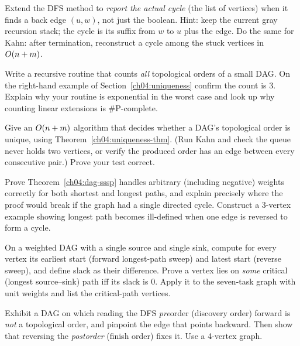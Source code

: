 \begin{exercise}
Extend the DFS method to \emph{report the actual cycle} (the list of vertices) when it finds a back
edge $(u,w)$, not just the boolean. Hint: keep the current gray recursion stack; the cycle is its
suffix from $w$ to $u$ plus the edge. Do the same for Kahn: after termination, reconstruct a cycle
among the stuck vertices in $O(n+m)$.
\end{exercise}

\begin{exercise}
Write a recursive routine that counts \emph{all} topological orders of a small DAG. On the right-hand
example of Section~\ref{ch04:uniqueness} confirm the count is $3$. Explain why your routine is
exponential in the worst case and look up why counting linear extensions is $\#\mathrm{P}$-complete.
\end{exercise}

\begin{exercise}
Give an $O(n+m)$ algorithm that decides whether a DAG's topological order is unique, using
Theorem~\ref{ch04:uniqueness-thm}. (Run Kahn and check the queue never holds two vertices, or verify
the produced order has an edge between every consecutive pair.) Prove your test correct.
\end{exercise}

\begin{exercise}
Prove Theorem~\ref{ch04:dag-sssp} handles arbitrary (including negative) weights correctly for both
shortest and longest paths, and explain precisely where the proof would break if the graph had a
single directed cycle. Construct a 3-vertex example showing longest path becomes ill-defined when one
edge is reversed to form a cycle.
\end{exercise}

\begin{exercise}
On a weighted DAG with a single source and single sink, compute for every vertex its earliest start
(forward longest-path sweep) and latest start (reverse sweep), and define slack as their difference.
Prove a vertex lies on \emph{some} critical (longest source--sink) path iff its slack is $0$. Apply it
to the seven-task graph with unit weights and list the critical-path vertices.
\end{exercise}

\begin{exercise}
Exhibit a DAG on which reading the DFS \emph{pre}order (discovery order) forward is \emph{not} a
topological order, and pinpoint the edge that points backward. Then show that reversing the
\emph{postorder} (finish order) fixes it. Use a 4-vertex graph.
\end{exercise}

